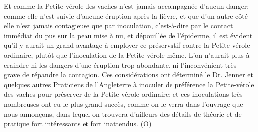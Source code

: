 Et comme la Petite-vérole des vaches n'est jamais accompagnée d'aucun danger; comme elle n'est suivie d'aucune éruption après la fièvre, et que d'un autre côté elle n'est jamais contagieuse que par inoculation, c'est-à-dire par le contact immédiat du pus sur la peau mise à nu, et dépouillée de l'épiderme, il est évident qu'il y aurait un grand avantage à employer ce préservatif contre la Petite-vérole ordinaire, plutôt que l'inoculation de la Petite-vérole même. L'on n'aurait plus à craindre ni les dangers d'une éruption trop abondante, ni l'inconvénient très-grave de répandre la contagion.
Ces considérations ont déterminé le Dr. Jenner et quelques autres Praticiens de l'Angleterre à inoculer de préférence la Petite-vérole des vaches pour préserver de la Petite-vérole ordinaire; et ces inoculations très-nombreuses ont eu le plus grand succès, comme on le verra dans l'ouvrage que nous annonçons, dans lequel on trouvera d'ailleurs des détails de théorie et de pratique fort intéressants et fort inattendus. (O)
